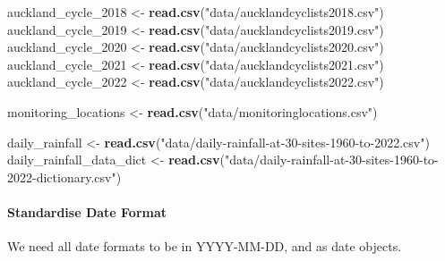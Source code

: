 \documentclass[
]{article}
\newenvironment{Shaded}{\begin{snugshade}}{\end{snugshade}}
\newcommand{\FunctionTok}[1]{\textcolor[rgb]{0.13,0.29,0.53}{\textbf{#1}}}
\newcommand{\NormalTok}[1]{#1}
\newcommand{\OtherTok}[1]{\textcolor[rgb]{0.56,0.35,0.01}{#1}}
\newcommand{\StringTok}[1]{\textcolor[rgb]{0.31,0.60,0.02}{#1}}
\begin{document}
\begin{Shaded}
\begin{Highlighting}[]
\NormalTok{auckland\_cycle\_2018 }\OtherTok{\textless{}{-}} \FunctionTok{read.csv}\NormalTok{(}\StringTok{"data/aucklandcyclists2018.csv"}\NormalTok{)}
\NormalTok{auckland\_cycle\_2019 }\OtherTok{\textless{}{-}} \FunctionTok{read.csv}\NormalTok{(}\StringTok{"data/aucklandcyclists2019.csv"}\NormalTok{)}
\NormalTok{auckland\_cycle\_2020 }\OtherTok{\textless{}{-}} \FunctionTok{read.csv}\NormalTok{(}\StringTok{"data/aucklandcyclists2020.csv"}\NormalTok{)}
\NormalTok{auckland\_cycle\_2021 }\OtherTok{\textless{}{-}} \FunctionTok{read.csv}\NormalTok{(}\StringTok{"data/aucklandcyclists2021.csv"}\NormalTok{)}
\NormalTok{auckland\_cycle\_2022 }\OtherTok{\textless{}{-}} \FunctionTok{read.csv}\NormalTok{(}\StringTok{"data/aucklandcyclists2022.csv"}\NormalTok{)}

\NormalTok{monitoring\_locations }\OtherTok{\textless{}{-}} \FunctionTok{read.csv}\NormalTok{(}\StringTok{"data/monitoringlocations.csv"}\NormalTok{)}

\NormalTok{daily\_rainfall }\OtherTok{\textless{}{-}} \FunctionTok{read.csv}\NormalTok{(}\StringTok{"data/daily{-}rainfall{-}at{-}30{-}sites{-}1960{-}to{-}2022.csv"}\NormalTok{)}
\NormalTok{daily\_rainfall\_data\_dict }\OtherTok{\textless{}{-}} \FunctionTok{read.csv}\NormalTok{(}\StringTok{"data/daily{-}rainfall{-}at{-}30{-}sites{-}1960{-}to{-}2022{-}dictionary.csv"}\NormalTok{)}
\end{Highlighting}
\end{Shaded}

\hypertarget{standardise-date-format}{%
\paragraph{Standardise Date Format}\label{standardise-date-format}}

We need all date formats to be in YYYY-MM-DD, and as date objects.
\end{document}

